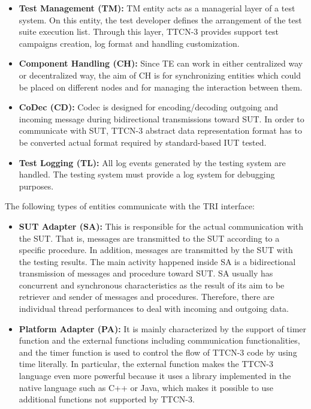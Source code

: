 \begin{itemize}
  \item \textbf{Test Management (TM):} TM entity acts as a managerial layer of a test system. On this entity, the test developer defines the arrangement of the test suite execution list. Through this layer, TTCN-3 provides support test campaigns creation, log format and handling customization. 
  
  \item \textbf{Component Handling (CH):} Since TE can work in either centralized way or decentralized way, the aim of CH is for synchronizing entities which could be placed on different nodes and for managing the interaction between them.
  
  \item \textbf{CoDec (CD):} Codec is designed for encoding/decoding outgoing and incoming message during bidirectional transmissions toward SUT. In order to communicate with SUT, TTCN-3 abstract data representation format has to be converted actual format required by standard-based IUT tested.
  
  \item \textbf {Test Logging (TL):} All log events generated by the testing system are handled. The testing system must provide a log system for debugging purposes.
\end{itemize}

The following types of entities communicate with the TRI interface:

\begin{itemize}
  \item \textbf{SUT Adapter (SA):} This is responsible for the actual communication with the  SUT. That is, messages are transmitted to the SUT according to a specific procedure. In addition, messages are transmitted by the SUT with the testing results. The main activity happened inside SA is a bidirectional transmission of messages and procedure toward SUT. SA usually has concurrent and synchronous characteristics as the result of its aim to be retriever and sender of messages and procedures. Therefore, there are individual thread performances to deal with incoming and outgoing data.
  \item \textbf{Platform Adapter (PA):} It is mainly characterized by the support of timer function and the external functions including communication functionalities, and the timer function is used to control the flow of TTCN-3 code by using time literally. In particular, the external function makes the TTCN-3 language even more powerful because it uses a library implemented in the native language such as C++ or Java, which makes it possible to use additional functions not supported by TTCN-3. 
\end{itemize}

